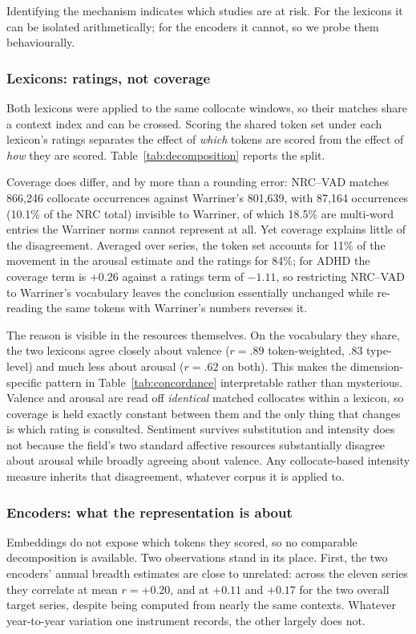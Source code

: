 \documentclass[final]{clv2025}
\begin{document}
Identifying the mechanism indicates which studies are at risk. For the lexicons it can be
isolated arithmetically; for the encoders it cannot, so we probe them behaviourally.

\subsubsection{Lexicons: ratings, not coverage}
Both lexicons were applied to the same collocate windows, so their matches share a context
index and can be crossed. Scoring the shared token set under each lexicon's ratings
separates the effect of \emph{which} tokens are scored from the effect of \emph{how} they
are scored. Table~\ref{tab:decomposition} reports the split.



Coverage does differ, and by more than a rounding error: NRC--VAD matches 866{,}246
collocate occurrences against Warriner's 801{,}639, with 87{,}164 occurrences (10.1\% of
the NRC total) invisible to Warriner, of which 18.5\% are multi-word entries the Warriner
norms cannot represent at all. Yet coverage explains little of the disagreement. Averaged
over series, the token set accounts for 11\% of the movement in the arousal estimate and
the ratings for 84\%; for ADHD the coverage term is $+0.26$ against a ratings term of
$-1.11$, so restricting NRC--VAD to Warriner's vocabulary leaves the conclusion essentially
unchanged while re-reading the same tokens with Warriner's numbers reverses it.

The reason is visible in the resources themselves. On the vocabulary they share, the two
lexicons agree closely about valence ($r = .89$ token-weighted, $.83$ type-level) and much
less about arousal ($r = .62$ on both). This makes the dimension-specific pattern in
Table~\ref{tab:concordance} interpretable rather than mysterious. Valence and arousal are
read off \emph{identical} matched collocates within a lexicon, so coverage is held exactly
constant between them and the only thing that changes is which rating is consulted.
Sentiment survives substitution and intensity does not because the field's two standard
affective resources substantially disagree about arousal while broadly agreeing about
valence. Any collocate-based intensity measure inherits that disagreement, whatever corpus
it is applied to.

\subsubsection{Encoders: what the representation is about}
Embeddings do not expose which tokens they scored, so no comparable decomposition is
available. Two observations stand in its place. First, the two encoders' annual breadth
estimates are close to unrelated: across the eleven series they correlate at mean
$r = +0.20$, and at $+0.11$ and $+0.17$ for the two overall target series, despite being
computed from nearly the same contexts. Whatever year-to-year variation one instrument
records, the other largely does not.
\end{document}
